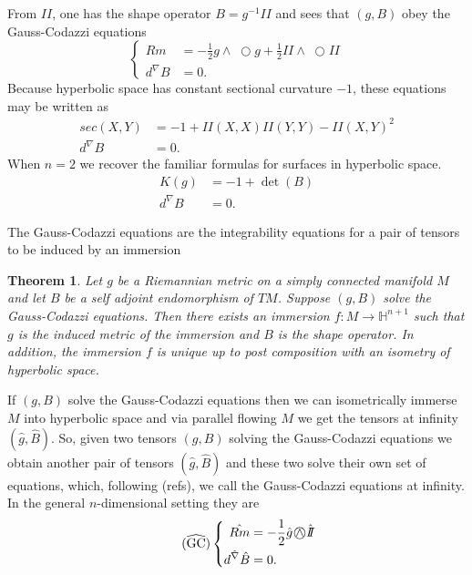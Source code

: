 \documentclass{amsart}
\newcommand{\two}{I\!\!I}
\newcommand{\wtimes}{\wedge \!\!\!\!\!\!\!\!\;\bigcirc}
\newtheorem{thm}{Theorem}[section]
\renewcommand{\H}{\mathbb{H}}
\begin{document}
From $\two$, one has the shape operator $B = g^{-1}\two$ and sees that $(g,B)$ obey the Gauss-Codazzi equations
\begin{equation}
\label{GC} \tag{GC}
\left\{
\begin{aligned}
Rm &= -\frac{1}{2}g \wtimes g + \frac{1}{2}\two \wtimes \two \\
d^\nabla B &= 0.
\end{aligned}
\right.
\end{equation}
Because hyperbolic space has constant sectional curvature $-1$, these equations may be written as
\begin{align*}
sec(X,Y) &= -1 + \two(X,X)\two(Y,Y) - \two(X,Y)^2 \\
d^\nabla B &= 0.
\end{align*}
When $n = 2$ we recover the familiar formulas for surfaces in hyperbolic space. 
\begin{align*}
K(g) &= -1 + \det(B) \\
d^\nabla B &= 0. 
\end{align*}

The Gauss-Codazzi equations are the integrability equations for a pair of tensors to be induced by an immersion

\begin{thm}
Let $g$ be a Riemannian metric on a simply connected manifold $M$ and let $B$ be a self adjoint endomorphism of $TM$. 
Suppose $(g,B)$ solve the Gauss-Codazzi equations. 
Then there exists an immersion $f: M \to \H^{n+1}$ such that $g$ is the induced metric of the immersion and $B$ is the shape operator. 
In addition, the immersion $f$ is unique up to post composition with an isometry of hyperbolic space. 
\end{thm}

If $(g,B)$ solve the Gauss-Codazzi equations then we can isometrically immerse $M$ into hyperbolic space and via parallel flowing $M$ we get the tensors at infinity $(\hat{g},\hat{B})$.
So, given two tensors $(g,B)$ solving the Gauss-Codazzi equations we obtain another pair of tensors $(\hat{g},\hat{B})$ and these two solve their own set of equations, which, following (refs), we call the Gauss-Codazzi equations at infinity.
In the general $n$-dimensional setting they are 
\begin{equation}
\label{GCInf} \tag{$\widehat{\text{GC}}$}
\left\{
\begin{aligned}
\hat{Rm} &= -\frac{1}{2} \hat{g} \wtimes \hat{\two} \\
d^{\hat{\nabla}} \hat{B} &= 0.
\end{aligned}
\right.
\end{equation}
\end{document}

